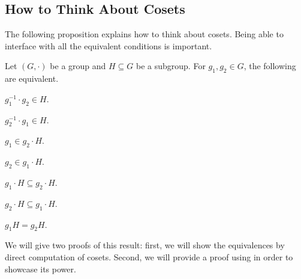 \documentclass[../main.tex]{subfiles}
\begin{document}
\subsection{How to Think About Cosets}
The following proposition explains how to think about cosets. Being able to interface with all the equivalent conditions is important.
\begin{proposition} \label{prop:how-to-coset}
    Let $(G,\cdot)$ be a group and $H\subseteq G$ be a subgroup. For $g_1,g_2\in G$, the following are equivalent.
    \begin{listalph}
        \item $g_1^{-1}\cdot g_2\in H$.
        \item $g_2^{-1}\cdot g_1\in H$.
        \item $g_1\in g_2\cdot H$.
        \item $g_2\in g_1\cdot H$.
        \item $g_1\cdot H\subseteq g_2\cdot H$.
        \item $g_2\cdot H\subseteq g_1\cdot H$.
        \item $g_1H=g_2H$.
    \end{listalph}
\end{proposition}
We will give two proofs of this result: first, we will show the equivalences by direct computation of cosets. Second, we will provide a proof using  in order to showcase its power.
\end{document}
